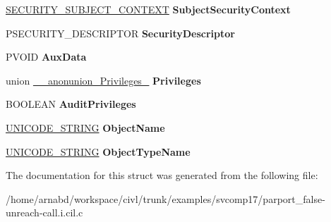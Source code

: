 \begin{DoxyCompactItemize}
\item 
\hypertarget{struct__ACCESS__STATE_ad7d2cab8c06c9a4b09332526fda381b9}{}\hyperlink{struct__SECURITY__SUBJECT__CONTEXT}{S\+E\+C\+U\+R\+I\+T\+Y\+\_\+\+S\+U\+B\+J\+E\+C\+T\+\_\+\+C\+O\+N\+T\+E\+X\+T} {\bfseries Subject\+Security\+Context}\label{struct__ACCESS__STATE_ad7d2cab8c06c9a4b09332526fda381b9}

\item 
\hypertarget{struct__ACCESS__STATE_a66c3c156e29ac2726998a3a34a9d61fd}{}P\+S\+E\+C\+U\+R\+I\+T\+Y\+\_\+\+D\+E\+S\+C\+R\+I\+P\+T\+O\+R {\bfseries Security\+Descriptor}\label{struct__ACCESS__STATE_a66c3c156e29ac2726998a3a34a9d61fd}

\item 
\hypertarget{struct__ACCESS__STATE_a9adcf3d383bfb22b4d23f7591e4b70bf}{}P\+V\+O\+I\+D {\bfseries Aux\+Data}\label{struct__ACCESS__STATE_a9adcf3d383bfb22b4d23f7591e4b70bf}

\item 
\hypertarget{struct__ACCESS__STATE_a65e9b76d91dbd4c8315b9761c0d8de43}{}union \hyperlink{union____anonunion__Privileges__40}{\+\_\+\+\_\+anonunion\+\_\+\+Privileges\+\_} {\bfseries Privileges}\label{struct__ACCESS__STATE_a65e9b76d91dbd4c8315b9761c0d8de43}

\item 
\hypertarget{struct__ACCESS__STATE_a8b67d9dffc2e3147e798ade5590a17e6}{}B\+O\+O\+L\+E\+A\+N {\bfseries Audit\+Privileges}\label{struct__ACCESS__STATE_a8b67d9dffc2e3147e798ade5590a17e6}

\item 
\hypertarget{struct__ACCESS__STATE_a30d6bb4fa069f7b7f0a1c8874b4d24b7}{}\hyperlink{struct__UNICODE__STRING}{U\+N\+I\+C\+O\+D\+E\+\_\+\+S\+T\+R\+I\+N\+G} {\bfseries Object\+Name}\label{struct__ACCESS__STATE_a30d6bb4fa069f7b7f0a1c8874b4d24b7}

\item 
\hypertarget{struct__ACCESS__STATE_ae52e8b7e149527ce9721219e63731fc7}{}\hyperlink{struct__UNICODE__STRING}{U\+N\+I\+C\+O\+D\+E\+\_\+\+S\+T\+R\+I\+N\+G} {\bfseries Object\+Type\+Name}\label{struct__ACCESS__STATE_ae52e8b7e149527ce9721219e63731fc7}

\end{DoxyCompactItemize}


The documentation for this struct was generated from the following file\+:\begin{DoxyCompactItemize}
\item 
/home/arnabd/workspace/civl/trunk/examples/svcomp17/parport\+\_\+false-\/unreach-\/call.\+i.\+cil.\+c\end{DoxyCompactItemize}
